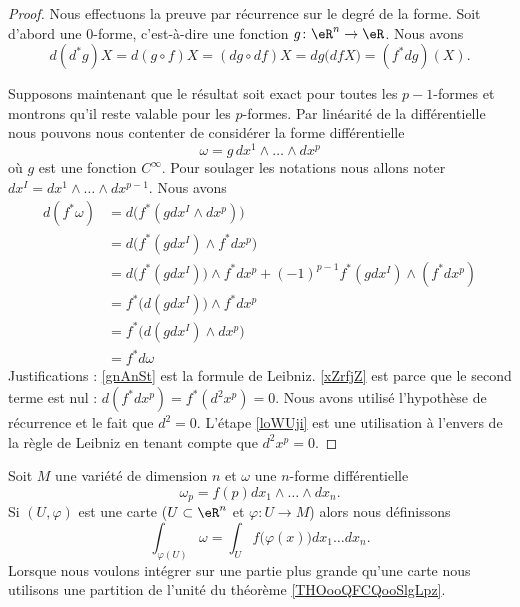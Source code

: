 \begin{proof}
	Nous effectuons la preuve par récurrence sur le degré de la forme. Soit d'abord une \( 0\)-forme, c'est-à-dire une fonction \( g\colon \eR^n\to \eR\). Nous avons
	\begin{equation}
		d(d^*g)X=d(g\circ f)X=(dg\circ df)X=dg\big( df X \big)=(f^*dg)(X).
	\end{equation}

	Supposons maintenant que le résultat soit exact pour toutes les \( p-1\)-formes et montrons qu'il reste valable pour les \( p\)-formes. Par linéarité de la différentielle nous pouvons nous contenter de considérer la forme différentielle
	\begin{equation}
		\omega=g\,dx^1\wedge\ldots\wedge dx^p
	\end{equation}
	où \( g\) est une fonction \(  C^{\infty}\). Pour soulager les notations nous allons noter \( dx^I=dx^1\wedge\ldots\wedge dx^{p-1}\). Nous avons
	\begin{subequations}
		\begin{align}
			d(f^*\omega) & =d\big( f^*(gdx^I\wedge dx^p) \big)                                                       \\
			             & =d\big( f^*(gdx^I)\wedge f^*dx^p \big)                                                    \\
			             & =d\big( f^*(gdx^I)\big)\wedge f^*dx^p+(-1)^{p-1}f^*(gdx^I)\wedge(f^*dx^p)  \label{gnAnSt} \\
			             & =f^*\big( d(gdx^I) \big)\wedge f^*dx^p      \label{xZrfjZ}                                \\
			             & =f^*\big( d(gdx^I)\wedge dx^p \big)                                                       \\
			             & =f^*d\omega        \label{loWUji}
		\end{align}
	\end{subequations}
	Justifications : \eqref{gnAnSt} est la formule de Leibniz. \eqref{xZrfjZ} est parce que le second terme est nul : \( d(f^*dx^p)=f^*(d^2x^p)=0\). Nous avons utilisé l'hypothèse de récurrence et le fait que \( d^2=0\). L'étape \eqref{loWUji} est une utilisation à l'envers de la règle de Leibniz en tenant compte que \( d^2x^p=0\).
\end{proof}


Soit \( M\) une variété de dimension \( n\) et \( \omega\) une \( n\)-forme différentielle
\begin{equation}
	\omega_p=f(p)dx_1\wedge\ldots\wedge dx_n.
\end{equation}
Si \( (U,\varphi)\) est une carte (\( U\subset\eR^n\) et \( \varphi\colon U\to M\)) alors nous définissons
\begin{equation}
	\int_{\varphi(U)}\omega=\int_{U}f\big( \varphi(x) \big)dx_1\ldots dx_n.
\end{equation}
Lorsque nous voulons intégrer sur une partie plus grande qu'une carte nous utilisons une partition de l'unité du théorème \ref{THOooQFCQooSlgLpz}.



